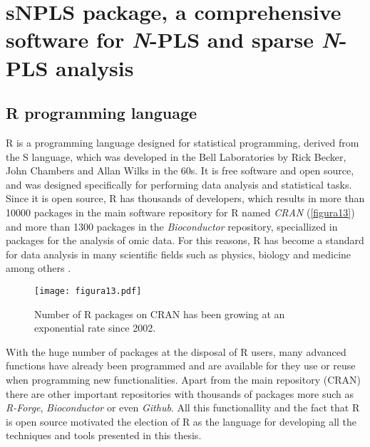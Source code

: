 
\chapter[sNPLS package, a comprehensive software for N-PLS and sparse N-PLS analysis]{sNPLS package, a comprehensive software for \textit{N}-PLS and sparse \textit{N}-PLS analysis}
\label{chapter:package}


\section{R programming language}
R \parencite{ihaka1996r, rsoftware} is a programming language designed for statistical programming, derived from the S language, which was developed in the Bell Laboratories by Rick Becker, John Chambers and Allan Wilks in the 60s. It is free software and open source, and was designed specifically for performing data analysis and statistical tasks. Since it is open source, R has thousands of developers, which results in more than 10000 packages in the main software repository for R named \textit{CRAN} (\autoref{figura13}) and more than 1300 packages in the \textit{Bioconductor} repository, speciallized in packages for the analysis of omic data. For this reasons, R has become a standard for data analysis in many scientific fields such as physics, biology and medicine among others \parencite{goztepe4facto}. 

\begin{figure}[hbtp]
	\centering
\texttt{[image: figura13.pdf]}
\caption{Number of R packages on CRAN has been growing at an exponential rate since 2002.}
\label{figura13}
\end{figure}

With the huge number of packages at the disposal of R users, many advanced functions have already been programmed and are available for they use or reuse when programming new functionalities. Apart from the main repository (CRAN) there are other important repositories with thousands of packages more such as \textit{R-Forge}, \textit{Bioconductor} or even \textit{Github}. All this functionallity and the fact that R is open source motivated the election of R as the language for developing all the techniques and tools presented in this thesis.


